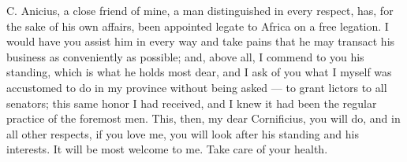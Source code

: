 

 C. Anicius, a close friend of mine, a man distinguished in every respect, has, for the sake of his own affairs, been appointed legate to Africa on a free legation. I would have you assist him in every way and take pains that he may transact his business as conveniently as possible; and, above all, I commend to you his standing, which is what he holds most dear, and I ask of you what I myself was accustomed to do in my province without being asked --- to grant lictors to all senators; this same honor I had received, and I knew it had been the regular practice of the foremost men. This, then, my dear Cornificius, you will do, and in all other respects, if you love me, you will look after his standing and his interests. It will be most welcome to me. Take care of your health.
